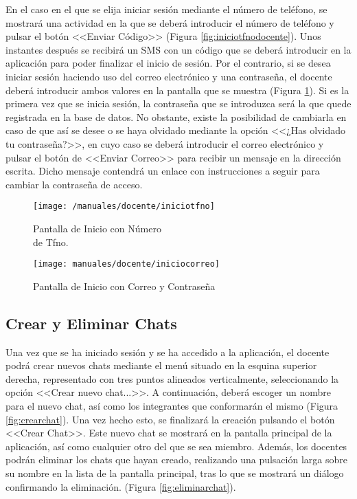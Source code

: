 En el caso en el que se elija iniciar sesión mediante el número de teléfono, se mostrará una actividad en la que se deberá introducir el número de teléfono y pulsar el botón <<Enviar Código>> (Figura \ref{fig:iniciotfnodocente}). Unos instantes después se recibirá un \acs{SMS} con un código que se deberá introducir en la aplicación para poder finalizar el inicio de sesión. Por el contrario, si se desea iniciar sesión haciendo uso del correo electrónico y una contraseña, el docente deberá introducir ambos valores en la pantalla que se muestra (Figura \ref{fig:iniciocorreodocente}). Si es la primera vez que se inicia sesión, la contraseña que se introduzca será la que quede registrada en la base de datos. No obstante, existe la posibilidad de cambiarla en caso de que así se desee o se haya olvidado mediante la opción <<¿Has olvidado tu contraseña?>>, en cuyo caso se deberá introducir el correo electrónico y pulsar el botón de <<Enviar Correo>> para recibir un mensaje en la dirección escrita. Dicho mensaje contendrá un enlace con instrucciones a seguir para cambiar la contraseña de acceso.

\begin{figure}[!h]
	\centering
	\begin{minipage}{.5\textwidth}
		\centering
		\texttt{[image: /manuales/docente/iniciotfno]}
		\caption{Pantalla de Inicio con Número \\ de Tfno.}
		\label{fig:iniciotfnodocente}
	\end{minipage}%
	\begin{minipage}{.5\textwidth}
		\centering
		\texttt{[image: manuales/docente/iniciocorreo]}
		\caption{Pantalla de Inicio con Correo y Contraseña}
		\label{fig:iniciocorreodocente}
	\end{minipage}
\end{figure}

\clearpage

\subsection*{Crear y Eliminar Chats}
Una vez que se ha iniciado sesión y se ha accedido a la aplicación, el docente podrá crear nuevos chats mediante el menú situado en la esquina superior derecha, representado con tres puntos alineados verticalmente, seleccionando la opción <<Crear nuevo chat...>>. A continuación, deberá escoger un nombre para el nuevo chat, así como los integrantes que conformarán el mismo (Figura \ref{fig:crearchat}). Una vez hecho esto, se finalizará la creación pulsando el botón <<Crear Chat>>. Este nuevo chat se mostrará en la pantalla principal de la aplicación, así como cualquier otro del que se sea miembro. Además, los docentes podrán eliminar los chats que hayan creado, realizando una pulsación larga sobre su nombre en la lista de la pantalla principal, tras lo que se mostrará un diálogo confirmando la eliminación. (Figura \ref{fig:eliminarchat}).

